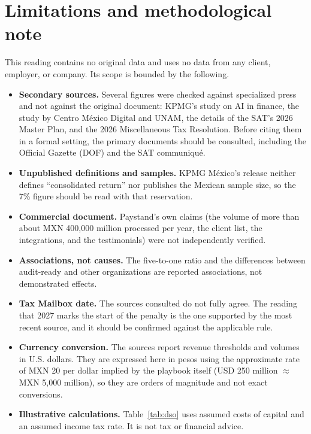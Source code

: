 \documentclass[11pt,a4paper]{article}
\begin{document}
\section{Limitations and methodological note}
\label{sec:limits}

This reading contains no original data and uses no data from any client, employer, or company. Its scope is bounded by the following.

\begin{itemize}[leftmargin=1.4em, itemsep=0.2em]
\item \textbf{Secondary sources.} Several figures were checked against specialized press and not against the original document: KPMG's study on AI in finance, the study by Centro M\'exico Digital and UNAM, the details of the SAT's 2026 Master Plan, and the 2026 Miscellaneous Tax Resolution. Before citing them in a formal setting, the primary documents should be consulted, including the Official Gazette (DOF) and the SAT communiqu\'e.
\item \textbf{Unpublished definitions and samples.} KPMG M\'exico's release neither defines ``consolidated return'' nor publishes the Mexican sample size, so the 7\% figure should be read with that reservation.
\item \textbf{Commercial document.} Paystand's own claims (the volume of more than about MXN 400,000 million processed per year, the client list, the integrations, and the testimonials) were not independently verified.
\item \textbf{Associations, not causes.} The five-to-one ratio and the differences between audit-ready and other organizations are reported associations, not demonstrated effects.
\item \textbf{Tax Mailbox date.} The sources consulted do not fully agree. The reading that 2027 marks the start of the penalty is the one supported by the most recent source, and it should be confirmed against the applicable rule.
\item \textbf{Currency conversion.} The sources report revenue thresholds and volumes in U.S. dollars. They are expressed here in pesos using the approximate rate of MXN 20 per dollar implied by the playbook itself (USD 250 million $\approx$ MXN 5,000 million), so they are orders of magnitude and not exact conversions.
\item \textbf{Illustrative calculations.} Table~\ref{tab:dso} uses assumed costs of capital and an assumed income tax rate. It is not tax or financial advice.
\end{itemize}
\end{document}
